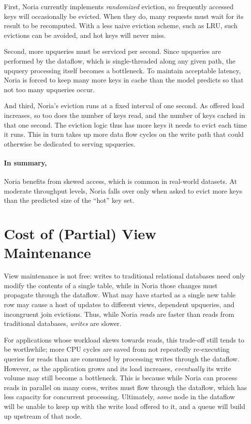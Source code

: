 First, Noria currently implements \emph{randomized} eviction, so frequently
accessed keys will occasionally be evicted. When they do, many requests must
wait for its result to be recomputed. With a less naive eviction scheme, such as
LRU, such evictions can be avoided, and hot keys will never miss.

Second, more upqueries must be serviced per second. Since upqueries are
performed by the dataflow, which is single-threaded along any given path, the
upquery processing itself becomes a bottleneck. To maintain acceptable latency,
Noria is forced to keep many more keys in cache than the model predicts so that
not too many upqueries occur.

And third, Noria's eviction runs at a fixed interval of one second. As offered
load increases, so too does the number of keys read, and the number of keys
cached in that one second. The eviction logic thus has more keys it needs to
evict each time it runs. This in turn takes up more data flow cycles on the
write path that could otherwise be dedicated to serving upqueries.

\paragraph{In summary,} Noria benefits from skewed access, which is common in
real-world datasets. At moderate throughput levels, Noria falls over only when
asked to evict more keys than the predicted size of the ``hot'' key set.

\section{Cost of (Partial) View Maintenance}
\label{s:eval:writes}

View maintenance is not free: writes to traditional relational databases need
only modify the contents of a single table, while in Noria those changes must
propagate through the dataflow. What may have started as a single new table row
may cause a host of updates to different views, dependent upqueries, and
incongruent join evictions. Thus, while Noria \emph{reads} are faster than reads
from traditional databases, \emph{writes} are slower.

For applications whose workload skews towards reads, this trade-off still tends
to be worthwhile; more CPU cycles are saved from not repeatedly re-executing
queries for reads than are consumed by processing writes through the dataflow.
However, as the application grows and its load increases, \emph{eventually} its
write volume may still become a bottleneck. This is because while Noria can
process reads in parallel on many cores, writes must flow through the dataflow,
which has less capacity for concurrent processing. Ultimately, \emph{some} node
in the dataflow will be unable to keep up with the write load offered to it, and
a queue will build up upstream of that node.

